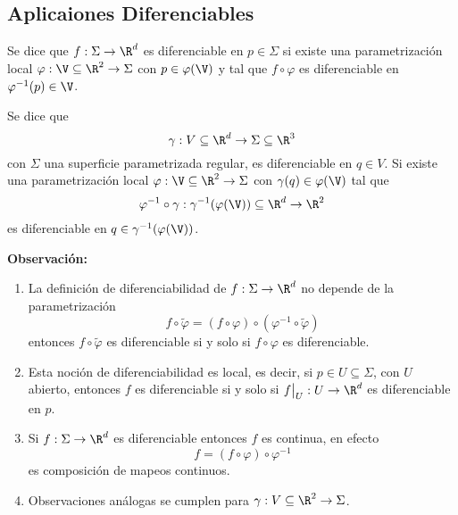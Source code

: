 \documentclass{article}
\begin{document}
\subsection{Aplicaiones Diferenciables}
\begin{dfn}
    Se dice que $f:\Sigma\to\R^{d}$ es diferenciable en $p\in\Sigma$ si existe una parametrización
    local $\varphi:\V\subseteq\R^{2}\to\Sigma$ con $p\in\varphi(\V)$ y tal que $f\circ\varphi$ es 
    diferenciable en $\varphi^{-1}(p)\in\V$.
\end{dfn}

\begin{dfn}
    Se dice que
    \begin{equation*}
        \gamma:V\subseteq\R^{d}\to\Sigma\subseteq\R^{3}
    \end{equation*}
    con $\Sigma$ una superficie parametrizada regular, es diferenciable en $q\in V$. Si existe una
    parametrización local $\varphi:\V\subseteq\R^{2}\to\Sigma$ con $\gamma(q)\in\varphi(\V)$ tal 
    que
    \begin{equation*}
        \varphi^{-1}\circ\gamma:\gamma^{-1}(\varphi(\V))\subseteq\R^{d}\to\R^{2}
    \end{equation*}
    es diferenciable en $q\in\gamma^{-1}(\varphi(\V))$.
\end{dfn}

\noindent\textbf{Observación:}
\begin{enumerate}
    \item La definición de diferenciabilidad de $f:\Sigma\to\R^{d}$ no depende de la 
    parametrización
    \begin{equation*}
        f\circ\widetilde{\varphi}=(f\circ\varphi)\circ(\varphi^{-1}\circ\widetilde{\varphi})
    \end{equation*}
    entonces $f\circ\widetilde{\varphi}$ es diferenciable si y solo si $f\circ\varphi$ es 
    diferenciable.

    \item Esta noción de diferenciabilidad es local, es decir, si $p\in U\subseteq\Sigma$, con
    $U$ abierto, entonces $f$ es diferenciable si y solo si $f\big|_{U}:U\to\R^{d}$ es 
    diferenciable en $p$.
    
    \item Si $f:\Sigma\to\R^{d}$ es diferenciable entonces $f$ es continua, en efecto
    \begin{equation*}
        f=(f\circ\varphi)\circ\varphi^{-1}
    \end{equation*}
    es composición de mapeos continuos.

    \item Observaciones análogas se cumplen para $\gamma:V\subseteq\R^{2}\to\Sigma$.
\end{enumerate}
\end{document}
